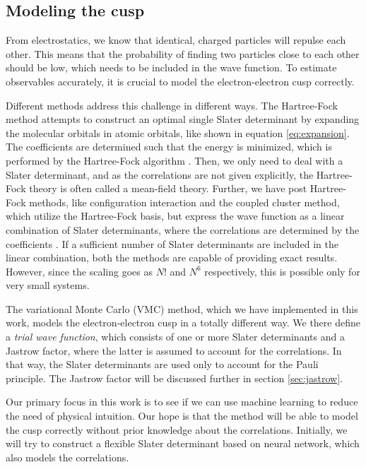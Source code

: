 \subsection{Modeling the cusp} \label{sec:cusp}
From electrostatics, we know that identical, charged particles will repulse each other. This means that the probability of finding two particles close to each other should be low, which needs to be included in the wave function. To estimate observables accurately, it is crucial to model the electron-electron cusp correctly.

Different methods address this challenge in different ways. The Hartree-Fock method attempts to construct an optimal single Slater determinant by expanding the molecular orbitals in atomic orbitals, like shown in equation \eqref{eq:expansion}. The coefficients are determined such that the energy is minimized, which is performed by the Hartree-Fock algorithm \cite{hartree_wave_1928, fock_selfconsistent_1930}. Then, we only need to deal with a Slater determinant, and as the correlations are not given explicitly, the Hartree-Fock theory is often called a mean-field theory. Further, we have post Hartree-Fock methods, like configuration interaction and the coupled cluster method, which utilize the Hartree-Fock basis, but express the wave function as a linear combination of Slater determinants, where the correlations are determined by the coefficients \cite{daniel_crawford_introduction_2007}. If a sufficient number of Slater determinants are included in the linear combination, both the methods are capable of providing exact results. However, since the scaling goes as $N!$ and $N^6$ respectively, this is possible only for very small systems.

The variational Monte Carlo (VMC) method, which we have implemented in this work, models the electron-electron cusp in a totally different way. We there define a \textit{trial wave function}, which consists of one or more Slater determinants and a Jastrow factor, where the latter is assumed to account for the correlations. In that way, the Slater determinants are used only to account for the Pauli principle. The Jastrow factor will be discussed further in section \ref{sec:jastrow}.

Our primary focus in this work is to see if we can use machine learning to reduce the need of physical intuition. Our hope is that the method will be able to model the cusp correctly without prior knowledge about the correlations. Initially, we will try to construct a flexible Slater determinant based on neural network, which also models the correlations.

